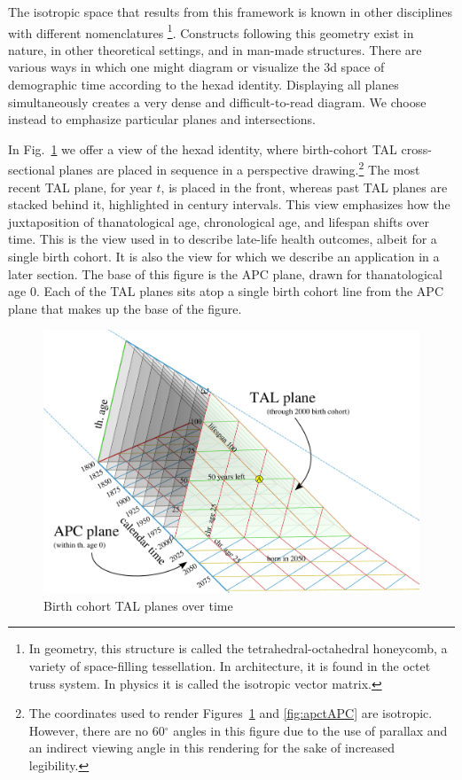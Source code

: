 \documentclass[12pt,oneside,a4paper]{article} %
\begin{document}
The isotropic space that results from this
framework is known in other disciplines with different
nomenclatures \footnote{In geometry, this structure is called the
tetrahedral-octahedral honeycomb, a variety of space-filling tessellation. In
architecture, it is found in the octet truss system. In physics it is called
the isotropic vector matrix.}.
Constructs following this geometry exist in nature, in other theoretical
settings, and in man-made structures. There are various ways in which one might
diagram or visualize the 3d space of demographic time according to the hexad
identity. Displaying all planes simultaneously creates a very dense and
difficult-to-read diagram. We choose instead to emphasize particular planes and
intersections.

In Fig.~\ref{fig:apctTAL} we
offer a view of the hexad identity, where birth-cohort TAL cross-sectional
planes are placed in sequence in a perspective drawing.\footnote{The coordinates
used to render Figures~\ref{fig:apctTAL} and \ref{fig:apctAPC} are isotropic.
However, there are no 60$^\circ$ angles in this figure due to the use of parallax and an indirect viewing angle in this rendering for the sake of increased legibility.} The most recent TAL plane, for year $t$, is placed in the front, whereas past TAL planes are stacked behind it, highlighted in century intervals.
This view emphasizes how the juxtaposition of thanatological age,
chronological age, and lifespan shifts over time. This is the view used in
\citet{riffe2015ttd} to describe late-life health
outcomes, albeit for a single birth cohort. It is also the view for which we
describe an application in a later section.
The base of this figure is the APC plane, drawn for thanatological age 0.
Each of the TAL planes sits atop a single birth cohort line from the APC plane that makes up the base of the
figure. 

\begin{figure}[!h]
\centering
\caption[cap]{Birth cohort TAL planes over time}
\label{fig:apctTAL}
\includegraphics[scale=.5]{Figures/TALisomarkedup2.pdf}
\end{figure}
\end{document}
